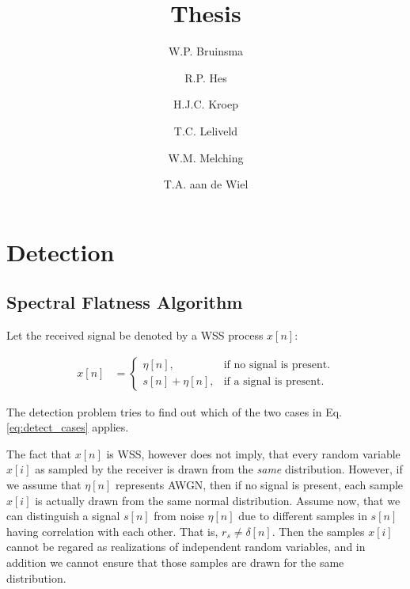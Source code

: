 \documentclass[a4paper, openany, oneside]{memoir}
\title{Thesis}
\author{W.P. Bruinsma \and R.P. Hes \and H.J.C. Kroep \and T.C. Leliveld \and W.M. Melching \and T.A. aan de Wiel}
\begin{document}
\frontmatter

\begin{titlingpage}
  \pagestyle{empty}
  \maketitle
\end{titlingpage}

\chapter{Detection}




\section{Spectral Flatness Algorithm}

Let the received signal be denoted by a WSS process $x[n]$:

\begin{align*}\label{eq:detect_cases}
x[n] &= \begin{cases}
    \eta[n], & \text{if no signal is present}.\\
    s[n] + \eta[n], & \text{if a signal is present}.
  \end{cases}
\end{align*}

The detection problem tries to find out which of the two cases in Eq. \ref{eq:detect_cases} applies.

The fact that $x[n]$ is WSS, however does not imply, that every random variable $x[i]$ as sampled by the receiver is drawn from the \emph{same} distribution. However, if we assume that $\eta[n]$ represents AWGN, then if no signal is present, each sample $x[i]$ is actually drawn from the same normal distribution. Assume now, that we can distinguish a signal $s[n]$ from noise $\eta[n]$ due to different samples in $s[n]$ having correlation with each other. That is, $r_s \neq \delta[n]$.  Then the samples $x[i]$ cannot be regared as realizations of independent random variables, and in addition we cannot ensure that those samples are drawn for the same distribution.
\end{document}

